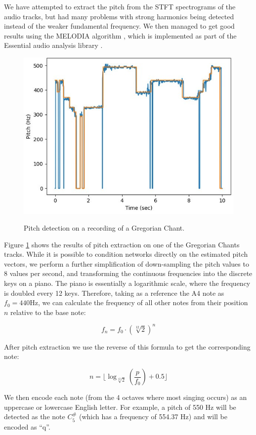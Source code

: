 \documentclass{article}
\begin{document}
We have attempted to extract the pitch from the STFT spectrograms of the audio tracks, but had many problems with strong harmonics being detected instead of the weaker fundamental frequency.
We then managed to get good results using the MELODIA algorithm \cite{melodia}, which is implemented as part of the Essential audio analysis library \cite{essentia}. 
\begin{figure}[ht]
	\vskip 0.2in
	\begin{center}
		{\includegraphics[width=0.7\columnwidth]{figures/pitch_detection.jpeg}}
		\caption{Pitch detection on a recording of a Gregorian Chant.}
		\label{pitch-detection}
	\end{center}
	\vskip -0.2in
\end{figure}
Figure \ref{pitch-detection} shows the results of pitch extraction on one of the Gregorian Chants tracks.
While it is possible to condition networks directly on the estimated pitch vectors,
we perform a further simplification of down-sampling the pitch values to 8 values per second,
and transforming the continuous frequencies into the discrete keys on a piano.
The piano is essentially a logarithmic scale, where the frequency is doubled every 12 keys.
Therefore, taking as a reference the A4 note as $f_0 = 440\text{Hz}$,
we can calculate the frequency of all other notes from their position $n$ relative to the base note:

$$
f_n = f_0 \cdot (\sqrt[12]{2})^n
$$

After pitch extraction we use the reverse of this formula to get the corresponding note:

$$
n = \lfloor\log_{\sqrt[12]{2}}\left(\frac{p}{f_0}\right) + 0.5\rfloor
$$

We then encode each note (from the 4 octaves where most singing occurs) as an uppercase or lowercase English letter.
For example, a pitch of 550 Hz will be detected as the note $C^{\#}_5$ (which has a frequency of 554.37 Hz)
and will be encoded as ``q''.
\end{document}
